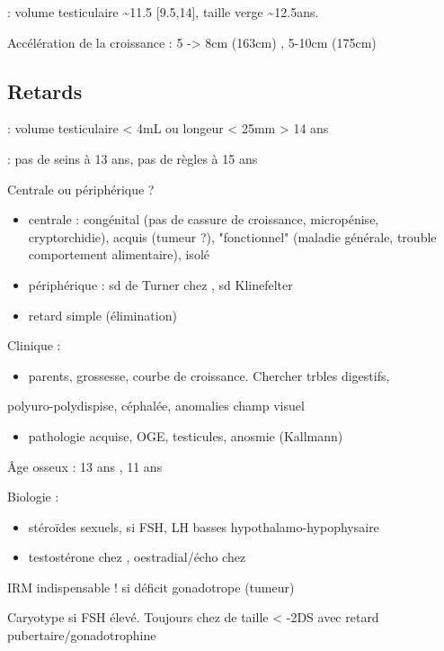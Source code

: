 \documentclass[11pt]{article}
\begin{document}
\male : \inc volume testiculaire \textasciitilde{}11.5 [9.5,14], \inc taille verge \textasciitilde{}12.5ans.

Accélération de la croissance : 5 -> 8cm (163cm) \female, 5-10cm (175cm)
\subsection{Retards}
\label{sec:orgac535a2}
\male :  volume testiculaire < 4mL ou longeur < 25mm > 14 ans 

\female : pas de seins à 13 ans, pas de règles à 15 ans

Centrale ou périphérique ?
\begin{itemize}
\item centrale : congénital (pas de cassure de croissance, micropénise,
cryptorchidie), acquis (tumeur ?), "fonctionnel" (maladie générale, trouble
comportement alimentaire), isolé
\item périphérique : sd de Turner chez \female, sd Klinefelter \male
\item retard simple (élimination)
\end{itemize}

Clinique : 
\begin{itemize}
\item parents, grossesse, courbe de croissance. Chercher trbles digestifs,
\end{itemize}
polyuro-polydispise, céphalée, anomalies champ visuel
\begin{itemize}
\item pathologie acquise, OGE, testicules, anosmie (Kallmann)
\end{itemize}

Âge osseux : 13 ans \male, 11 ans \female

Biologie : 
\begin{itemize}
\item stéroïdes sexuels, si FSH, LH basses \thus hypothalamo-hypophysaire
\item testostérone chez \male, oestradial/écho chez \female
\end{itemize}

IRM indispensable ! si déficit gonadotrope (tumeur)

Caryotype si FSH élevé. Toujours chez \female de taille < -2DS avec retard
pubertaire/gonadotrophine \inc
\end{document}
